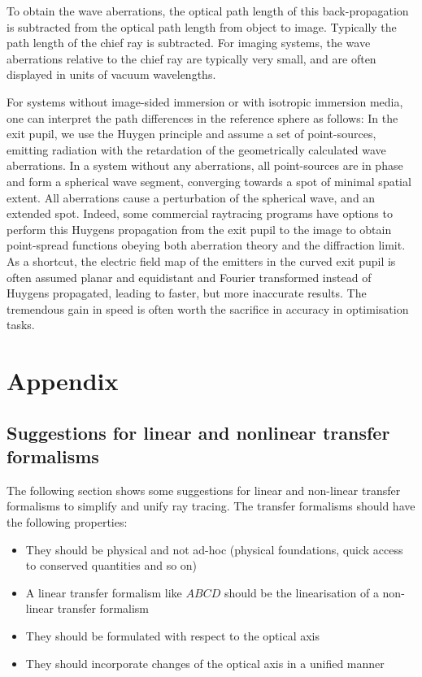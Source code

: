 \documentclass[12pt,a4paper,twoside,openright,BCOR10mm,headsepline,titlepage,abstracton,chapterprefix,final]{scrreprt}
\begin{document}
To obtain the wave aberrations, the optical path length of this back-propagation is subtracted from the optical path length from object to image.
Typically the path length of the chief ray is subtracted. 
For imaging systems, the wave aberrations relative to the chief ray are typically very small, and are often displayed in units of vacuum wavelengths.

For systems without image-sided immersion or with isotropic immersion media, one can interpret the path differences in the reference sphere as follows:
In the exit pupil, we use the Huygen principle and assume a set of point-sources, emitting radiation with the retardation of the geometrically calculated wave aberrations.
In a system without any aberrations, all point-sources are in phase and form a spherical wave segment, converging towards a spot of minimal spatial extent.
All aberrations cause a perturbation of the spherical wave, and an extended spot.
Indeed, some commercial raytracing programs have options to perform this Huygens propagation from the exit pupil to the image to obtain point-spread functions obeying both aberration theory and the diffraction limit.
As a shortcut, the electric field map of the emitters in the curved exit pupil is often assumed planar and equidistant and Fourier transformed instead of Huygens propagated, leading to faster, but more inaccurate results.
The tremendous gain in speed is often worth the sacrifice in accuracy in optimisation tasks.



\chapter{Appendix}
\section{Suggestions for linear and nonlinear transfer formalisms}
The following section shows some suggestions for linear and non-linear transfer formalisms
to simplify and unify ray tracing. The transfer formalisms should have the following properties:

\begin{itemize}
 \item They should be physical and not ad-hoc (physical foundations, quick access to conserved quantities and so on)
 \item A linear transfer formalism like $ABCD$ should be the linearisation of a non-linear transfer formalism
 \item They should be formulated with respect to the optical axis
 \item They should incorporate changes of the optical axis in a unified manner
\end{itemize}
\end{document}
